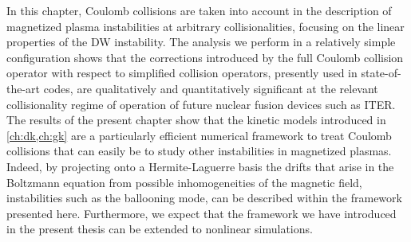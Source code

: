 In this chapter, Coulomb collisions are taken into account in the description of magnetized plasma instabilities at arbitrary collisionalities, focusing on the linear properties of the DW instability.
%
The analysis we perform in a relatively simple configuration shows that the corrections introduced by the full Coulomb collision operator with respect to simplified collision operators, presently used in state-of-the-art codes, are qualitatively and quantitatively significant at the relevant collisionality regime of operation of future nuclear fusion devices such as ITER.
%
The results of the present chapter show that the kinetic models introduced in \cref{ch:dk,ch:gk} are a particularly efficient numerical framework to treat Coulomb collisions that can easily be to study other instabilities in magnetized plasmas.
%
Indeed, by projecting onto a Hermite-Laguerre basis the drifts that arise in the Boltzmann equation from possible inhomogeneities of the magnetic field, instabilities such as the ballooning mode, can be described within the framework presented here.
%
Furthermore, we expect that the framework we have introduced in the present thesis can be extended to nonlinear simulations.
